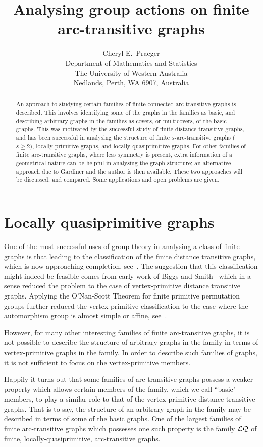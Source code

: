 \documentclass[12pt, a4paper]{article}
\title{Analysing group actions on finite arc-transitive graphs}
\author{ Cheryl E.~Praeger\\
        Department of Mathematics and Statistics\\
        The University of Western Australia\\
        Nedlands, Perth, WA 6907, Australia}
\date{}
\def\FB{{\cal LQ}}
\begin{document}
         
\jot
\maketitle 

\begin{abstract}
An approach to studying certain families of finite 
connected arc-transitive graphs is described. 
This involves identifying some of the graphs in the families
as basic, and describing arbitrary graphs in the families
as covers, or multicovers, of the basic graphs. 
This was motivated by the successful study of finite
distance-transitive graphs, and has been successful in analysing the 
structure of finite $s$-arc-transitive graphs ($s\geq 2$), 
locally-primitive graphs, and locally-quasiprimitive graphs. 
For other families of finite arc-transitive graphs, where less
symmetry is present, extra information of a geometrical nature 
can be helpful in analysing the graph structure; an alternative 
approach due to Gardiner and the author is then available. 
These two approaches will be discussed, and compared.
Some applications and open problems are given.
\end{abstract}


\section{Locally quasiprimitive graphs}

One of the most successful uses of group theory in analysing a class 
of finite graphs is that leading to the
classification of the finite distance transitive graphs, which is
now approaching completion, see~\cite{ivanov}. The suggestion that
this classification might indeed be feasible comes from early work
of Biggs and Smith~\cite{biggs, smith} which in a sense reduced the
problem to the case of vertex-primitive distance transitive graphs.
Applying the O'Nan-Scott Theorem for finite primitive permutation groups
further reduced the vertex-primitive classification to the case
where the automorphism group is almost simple or affine, see~\cite{psy}. 

However, for many other interesting families of finite arc-transitive 
graphs, it is not possible to describe the structure of arbitrary
graphs in the family in terms of vertex-primitive graphs in the family.
In order to describe  such families of graphs, it is not sufficient 
to focus on the vertex-primitive members.

Happily it turns out that some families of arc-transitive graphs 
possess a weaker property which allows certain members of the 
family, which we call ``basic"  members, to play a similar role to
that of the vertex-primitive distance-transitive graphs. That is to say,
the structure of an arbitrary graph in the family may be described in 
terms of some of the  basic graphs.
One of the largest families of finite arc-transitive graphs which 
possesses one such property is the family $\FB$  
of finite, locally-quasiprimitive, arc-transitive graphs.
\end{document}
